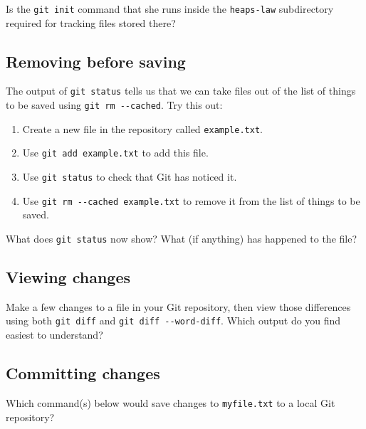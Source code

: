 \documentclass[
]{krantz}
\providecommand{\tightlist}{%
  \setlength{\itemsep}{0pt}\setlength{\parskip}{0pt}}
\begin{document}
Is the \texttt{git\ init} command that she runs inside the \texttt{heaps-law} subdirectory
required for tracking files stored there?

\hypertarget{git-cmdline-ex-unsave}{%
\subsection{Removing before saving}\label{git-cmdline-ex-unsave}}

The output of \texttt{git\ status} tells us that
we can take files out of the list of things to be saved
using \texttt{git\ rm\ -\/-cached}.
Try this out:

\begin{enumerate}
\def\labelenumi{\arabic{enumi}.}
\tightlist
\item
  Create a new file in the repository called \texttt{example.txt}.
\item
  Use \texttt{git\ add\ example.txt} to add this file.
\item
  Use \texttt{git\ status} to check that Git has noticed it.
\item
  Use \texttt{git\ rm\ -\/-cached\ example.txt} to remove it from the list of things to be saved.
\end{enumerate}

What does \texttt{git\ status} now show?
What (if anything) has happened to the file?

\hypertarget{git-cmdline-ex-word-diff}{%
\subsection{Viewing changes}\label{git-cmdline-ex-word-diff}}

Make a few changes to a file in your Git repository,
then view those differences using both \texttt{git\ diff}
and \texttt{git\ diff\ -\/-word-diff}.
Which output do you find easiest to understand?

\hypertarget{git-cmdline-ex-commit}{%
\subsection{Committing changes}\label{git-cmdline-ex-commit}}

Which command(s) below would save changes to \texttt{myfile.txt} to a local Git repository?
\end{document}
